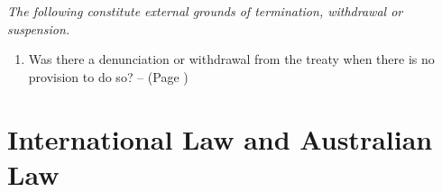 \begin{enumerate}
\begin{enumerate}
\begin{enumerate}
        \end{enumerate}
    \end{enumerate}
    \textit{The following constitute external grounds of termination, withdrawal or suspension.}
    \begin{enumerate}[resume]
        \item Was there a denunciation or withdrawal from the treaty when there is no provision to do so? --  (Page \pageref{VCLT Art 56})
    \end{enumerate}
\end{enumerate}

\section{International Law and Australian Law}